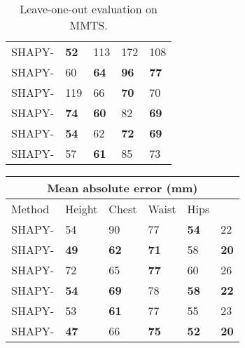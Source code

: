 \documentclass[10pt,twocolumn,letterpaper]{article}
\newcommand{\modelCOLOR}{black}
\newcommand{\modelname}{{\color{\modelCOLOR}SHAPY}\xspace}
\newcommand{\colorattr}{\color{PineGreen}}
\newcommand{\colorheight}{\color{Bittersweet}}
\newcommand{\colorcirc}{\color{OrangeRed}}
\newcommand{\heightVar}[0]{{\colorheight{H}}}
\newcommand{\attrVar}[0]{{\colorattr{A}}}
\newcommand{\circVar}[0]{{\colorcirc{C}}}
\newcommand{\mmts}{MMTS\xspace}
\newcommand{\vspaceTABaboveCaption}{-0.0 em}
\newcommand{\vtovHD}{\mbox{}\xspace}
\newcommand{\myarraystretch}[0]{1.1}
\begin{document}
\begin{appendices}
\begin{table}[t!]
\begin{tabular}{lllll}
        \modelname-\heightVar                 & \textbf{52} & 113         & 172         & 108         \\
        \modelname-\heightVar\attrVar         & 60          & \textbf{64} & \textbf{96} & \textbf{77} \\ \modelname-\circVar                   & 119         & 66          & \textbf{70} & 70          \\
        \modelname-\circVar\attrVar           & \textbf{74} & \textbf{60} & 82          & \textbf{69} \\ \modelname-\heightVar\circVar         & \textbf{54} & 62          & \textbf{72} & \textbf{69} \\
        \modelname-\heightVar\circVar\attrVar & 57          & \textbf{61} & 85          & 73          \\
        \bottomrule
    \end{tabular}
    \vspace{\vspaceTABaboveCaption}
    \caption{
        Leave-one-out evaluation on \mmts.}
    \label{tab:mmts_leave_one_out}
\end{table} \begin{table}[t!]
    \renewcommand{\arraystretch}{\myarraystretch}
    \centering
    \scriptsize
    \begin{tabular}{llllll}
        \toprule
        \multicolumn{6}{c}{Mean absolute error (mm) }                                                   \\
        \midrule
        Method                                & Height      & Chest       & Waist       & Hips        & \vtovHD     \\

        \modelname-\heightVar                 & 54          & 90          & 77          & \textbf{54} & 22          \\
        \modelname-\heightVar\attrVar         & \textbf{49} & \textbf{62} & \textbf{71} & 58          & \textbf{20} \\ \modelname-\circVar                   & 72          & 65          & \textbf{77} & 60          & 26          \\
        \modelname-\circVar\attrVar           & \textbf{54} & \textbf{69} & 78          & \textbf{58} & \textbf{22}
        \\ \modelname-\heightVar\circVar         & 53          & \textbf{61} & 77          & 55          & 23          \\
        \modelname-\heightVar\circVar\attrVar & \textbf{47} & 66          & \textbf{75} & \textbf{52} & \textbf{20} \\



\end{tabular}
\end{table}
\end{appendices}
\end{document}
